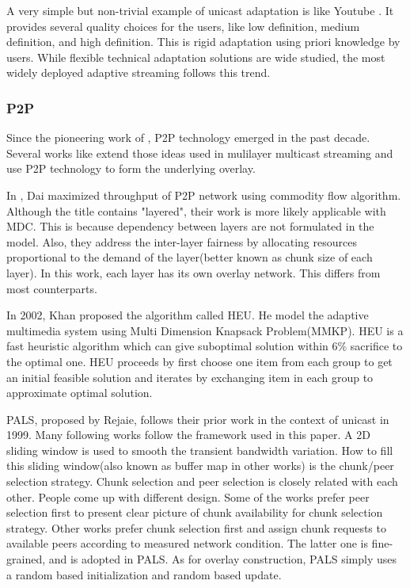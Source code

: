 \documentclass[11pt,a4paper]{article}
\begin{document}
A very simple but non-trivial example of unicast adaptation is like Youtube
\cite{youtube}. It provides several quality choices for the users, like 
low definition, medium definition, and high definition. This is rigid 
adaptation using priori knowledge by users. While flexible technical 
adaptation solutions are wide studied, the most widely deployed 
adaptive streaming follows this trend. 

\subsubsection{P2P}

Since the pioneering work of \cite{chu2001case}, P2P technology 
emerged in the past decade. Several works like \cite{cui2003layered}
extend those ideas used in mulilayer multicast streaming and use
P2P technology to form the underlying overlay. 

In \cite{dai2007maximizing}, Dai maximized throughput of P2P network 
using commodity flow algorithm. Although the title contains "layered", 
their work is more likely applicable with MDC. This is because 
dependency between layers are not formulated in the model. Also, they 
address the inter-layer fairness by allocating resources proportional 
to the demand of the layer(better known as chunk size of each layer).
In this work, each layer has its own overlay network. This differs 
from most counterparts. 

In 2002, Khan proposed the algorithm called HEU\cite{khan2002solving}. 
He model the adaptive multimedia system using Multi Dimension Knapsack Problem(MMKP).
HEU is a fast heuristic algorithm which can give suboptimal solution 
within 6\% sacrifice to the optimal one. HEU proceeds by first choose
one item from each group to get an initial feasible solution and
iterates by exchanging item in each group to approximate optimal 
solution. 

PALS\cite{rejaie2003pals}, proposed by Rejaie, follows their prior work 
in the context of unicast in 1999\cite{rejaie1999quality}. Many following 
works follow the framework used in this paper. A 2D sliding window 
is used to smooth the transient bandwidth variation. How to fill this 
sliding window(also known as buffer map in other works) is the 
chunk/peer selection strategy. Chunk selection and peer selection is closely 
related with each other. People come up with different design. 
Some of the works prefer peer selection first to present clear picture of 
chunk availability for chunk selection strategy. Other works prefer 
chunk selection first and assign chunk requests to available peers 
according to measured network condition. The latter one is fine-grained, 
and is adopted in PALS. As for overlay construction, PALS simply uses
a random based initialization and random based update. 
\end{document}
